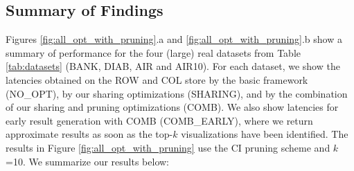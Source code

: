 

\subsection{Summary of Findings}
\label{sec:expt_summary}

Figures \ref{fig:all_opt_with_pruning}.a and \ref{fig:all_opt_with_pruning}.b show a summary of \SeeDB performance for the four 
(large) real datasets from Table \ref{tab:datasets} (BANK, DIAB, AIR and AIR10).
For each dataset, we show the latencies obtained on the ROW and COL store by the basic \SeeDB framework (NO\_OPT), 
by our sharing optimizations (SHARING), and by the combination of our sharing and pruning optimizations (COMB). 
We also show latencies for early result generation with COMB (COMB\_EARLY), where we return approximate results 
as soon as the top-$k$ visualizations have been identified.
The results in Figure \ref{fig:all_opt_with_pruning} 
use the CI pruning scheme and $k$=10. We summarize our results below:



